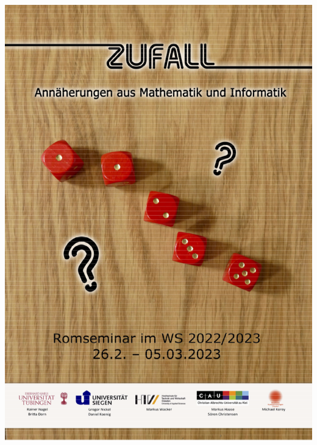 \begin{titlepage}
\begin{center}
\includegraphics[width=14cm, height=28cm, keepaspectratio=true]{./content/Poster_Zufall.png}

\end{center}
\end{titlepage}
